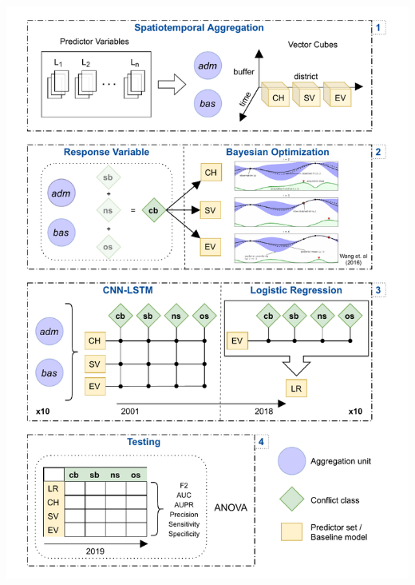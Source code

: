 \documentclass[a4paper,11pt]{article}
\begin{document}
\includegraphics{../assets/wf.pdf}

\newpage

\newpage
\tableofcontents
\clearpage
\end{document}
